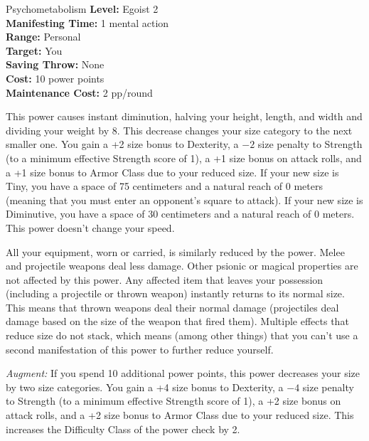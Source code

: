 {Psychometabolism}
{
	\textbf{Level:}
	Egoist 2\\
	\textbf{Manifesting Time:}
	1 mental action\\
	\textbf{Range:}
	Personal\\
	\textbf{Target:}
	You\\
	\textbf{Saving Throw:}
	None\\
	\textbf{Cost:}
	10 power points\\
	\textbf{Maintenance Cost:}
	2 pp/round\\
}
{
	This power causes instant diminution, halving your height, length, and width and dividing your weight by 8. This decrease changes your size category to the next smaller one. You gain a +2 size bonus to Dexterity, a $-2$ size penalty to Strength (to a minimum effective Strength score of 1), a +1 size bonus on attack rolls, and a +1 size bonus to Armor Class due to your reduced size. If your new size is Tiny, you have a space of 75 centimeters and a natural reach of 0 meters (meaning that you must enter an opponent's square to attack). If your new size is Diminutive, you have a space of 30 centimeters and a natural reach of 0 meters. This power doesn't change your speed.

	All your equipment, worn or carried, is similarly reduced by the power. Melee and projectile weapons deal less damage. Other psionic or magical properties are not affected by this power. Any affected item that leaves your possession (including a projectile or thrown weapon) instantly returns to its normal size. This means that thrown weapons deal their normal damage (projectiles deal damage based on the size of the weapon that fired them). Multiple effects that reduce size do not stack, which means (among other things) that you can't use a second manifestation of this power to further reduce yourself.

	\textit{Augment:} If you spend 10 additional power points,  this power decreases your size by two size categories. You gain a +4 size bonus to Dexterity, a $-4$ size penalty to Strength (to a minimum effective Strength score of 1), a +2 size bonus on attack rolls, and a +2 size bonus to Armor Class due to your reduced size. This increases the Difficulty Class of the power check by 2.
}